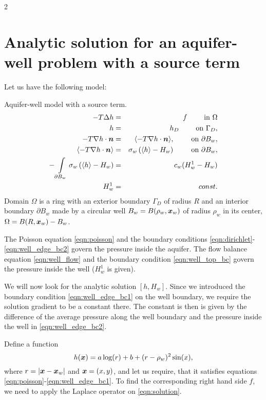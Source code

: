 


2

\section{Analytic solution for an aquifer-well problem with a source term}

Let us have the following model:
\begin{thmproblem} \label{thm:problem} Aquifer-well model with a source term.
\begin{eqnarray}
-T \Delta h &=& f \qquad \textrm{ in } \Omega \label{eqn:poisson}\\
h &=& h_D \qquad \textrm{ on } \Gamma_D, \label{eqn:dirichlet} \\
-T\nabla h \cdot \mathbf{\boldsymbol{n}}&=& \langle -T\nabla h \cdot \mathbf{\boldsymbol{n}}\rangle, \qquad \textrm{ on } \partial B_w, \label{eqn:well_edge_bc1}\\
  \langle -T\nabla h \cdot \mathbf{\boldsymbol{n}}\rangle &=& \sigma_w\left( \langle h \rangle - H_w \right) 
          \qquad \textrm{ on } \partial B_w, \label{eqn:well_edge_bc2} \\
-\int \limits_{\partial B_w} \sigma_w\left(\langle h\rangle - H_w\right) &=& c_w(H^1_w - H_w) \label{eqn:well_flow}\\
H^1_w &=& const. \label{eqn:well_top_bc}    
\end{eqnarray}
Domain $\Omega$ is a ring with an exterior boundary $\Gamma_D$ of radius $R$ and an interior boundary $\partial B_w$ 
made by a circular well $B_w=B(\rho_w,\mathbf{\boldsymbol{x}}_w)$ of radius $\rho_w$ in its center, $\Omega = B(R,\mathbf{\boldsymbol{x}}_w) - B_w$.

The Poisson equation \eqref{eqn:poisson} and the boundary conditions \eqref{eqn:dirichlet}-\eqref{eqn:well_edge_bc2}
govern the pressure inside the aquifer. The flow balance equation \eqref{eqn:well_flow} and the boundary condition
\eqref{eqn:well_top_bc} govern the pressure inside the well ($H^1_w$ is given).
\end{thmproblem}

We will now look for the analytic solution $[h, H_w]$.
Since we introduced the boundary condition \eqref{eqn:well_edge_bc1} on the well boundary,
we require the solution gradient to be a constant there. 
The constant is then is given by the difference of the average pressure along the well boundary 
and the pressure inside the well in \eqref{eqn:well_edge_bc2}.

Define a function
\begin{equation} \label{eqn:solution}
  h(\mathbf{\boldsymbol{x}}) = a\log(r) + b + (r-\rho_w)^2 \sin(x),
\end{equation}
where $r = |\mathbf{\boldsymbol{x}}-\mathbf{\boldsymbol{x}}_w|$ and $\mathbf{\boldsymbol{x}}=(x,y)$,
and let us require, that it satisfies equations \eqref{eqn:poisson}-\eqref{eqn:well_edge_bc1}.
To find the corresponding right hand side $f$, we need to apply the Laplace operator on \eqref{eqn:solution}.

